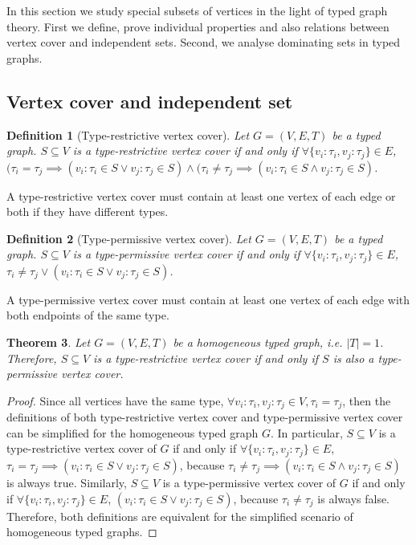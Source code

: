 \documentclass[preprint,12pt]{elsarticle}
\theoremstyle{plain}
\newtheorem{theorem}{Theorem}[section]
\newtheorem{definition}[theorem]{Definition}
\newcommand\tyv[2]{#1\!\!:\!\!#2}
\begin{document}
In this section we study special subsets of vertices
in the light of typed graph theory.
First we
define, prove individual properties
and also relations between vertex cover
and independent sets.
Second, we analyse dominating sets in
typed graphs.

\subsection{Vertex cover and independent set}

\begin{definition}[Type-restrictive vertex cover]
Let $G = (V,E,T)$ be a typed graph.
$S\subseteq V$ is a type-restrictive vertex cover
if and only if
$\forall \{\tyv{v_i}{\tau_i},\tyv{v_j}{\tau_j}\}\in E$,
$(\tau_i=\tau_j \implies (\tyv{v_i}{\tau_i}\in S \vee \tyv{v_j}{\tau_j}\in S)
\wedge 
(\tau_i\neq\tau_j \implies (\tyv{v_i}{\tau_i}\in S \wedge \tyv{v_j}{\tau_j}\in S)$.
\end{definition}

A type-restrictive vertex cover must contain
at least one vertex of each edge or both if they have different types.

\begin{definition}[Type-permissive vertex cover]
Let $G = (V,E,T)$ be a typed graph.
$S\subseteq V$ is a type-permissive vertex cover
if and only if
$\forall \{\tyv{v_i}{\tau_i},\tyv{v_j}{\tau_j}\}\in E$,
$\tau_i\neq\tau_j \vee (\tyv{v_i}{\tau_i}\in S \vee \tyv{v_j}{\tau_j}\in S)$.
\end{definition}

A type-permissive vertex cover must contain
at least one vertex of each edge with both endpoints of the same type.

\begin{theorem}
Let $G = (V,E,T)$ be a homogeneous typed graph, i.e. $|T|=1$.
Therefore, $S\subseteq V$ is a type-restrictive vertex cover
if and only if $S$ is also a type-permissive vertex cover.
\end{theorem}
\begin{proof}
Since all vertices have the same type,
$\forall \tyv{v_i}{\tau_i},\tyv{v_j}{\tau_j}\in V, \tau_i=\tau_j$,
then
the definitions of both type-restrictive vertex cover
and type-permissive vertex cover can be simplified
for the homogeneous typed graph $G$.
In particular,
$S\subseteq V$ is a type-restrictive vertex cover of $G$
if and only if
$\forall \{\tyv{v_i}{\tau_i},\tyv{v_j}{\tau_j}\}\in E$,
$\tau_i=\tau_j \implies (\tyv{v_i}{\tau_i}\in S \vee \tyv{v_j}{\tau_j}\in S)$,
because
$\tau_i\neq\tau_j \implies (\tyv{v_i}{\tau_i}\in S \wedge \tyv{v_j}{\tau_j}\in S)$
is always true.
Similarly,
$S\subseteq V$ is a type-permissive vertex cover of $G$
if and only if
$\forall \{\tyv{v_i}{\tau_i},\tyv{v_j}{\tau_j}\}\in E$,
$(\tyv{v_i}{\tau_i}\in S \vee \tyv{v_j}{\tau_j}\in S)$,
because
$\tau_i\neq\tau_j$ is always false.
Therefore, both definitions are equivalent for the simplified 
scenario of homogeneous typed graphs.
\end{proof}
\end{document}
